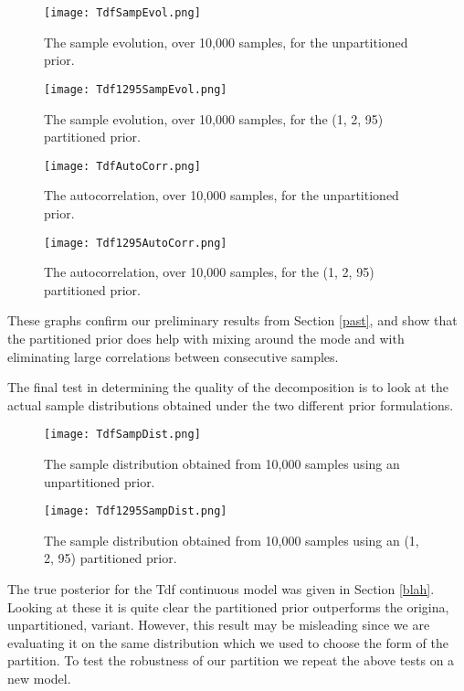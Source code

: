 \begin{figure}[H]
    \centering
    \texttt{[image: TdfSampEvol.png]}
    \caption{The sample evolution, over 10,000 samples, for the unpartitioned prior.}
    \label{fig:UnpSampEvol}
\end{figure}

\begin{figure}[H]
    \centering
    \texttt{[image: Tdf1295SampEvol.png]}
    \caption{The sample evolution, over 10,000 samples, for the (1, 2, 95) partitioned prior.}
    \label{fig:1295SampEvol}
\end{figure}

\begin{figure}[H]
    \centering
    \texttt{[image: TdfAutoCorr.png]}
    \caption{The autocorrelation, over 10,000 samples, for the unpartitioned prior.}
    \label{fig:UnpAutoCorr}
\end{figure}

\begin{figure}[H]
    \centering
    \texttt{[image: Tdf1295AutoCorr.png]}
    \caption{The autocorrelation, over 10,000 samples, for the (1, 2, 95) partitioned prior.}
    \label{fig:1295AutoCorr}
\end{figure}

These graphs confirm our preliminary results from Section \ref{past}, and show that the partitioned prior does help with mixing around the mode and with eliminating large correlations between consecutive samples.

The final test in determining the quality of the decomposition is to look at the actual sample distributions obtained under the two different prior formulations.

\begin{figure}[H]
    \centering
    \texttt{[image: TdfSampDist.png]}
    \caption{The sample distribution obtained from 10,000 samples using an unpartitioned prior.}
    \label{fig:UnpSampDist}
\end{figure}

\begin{figure}[H]
    \centering
    \texttt{[image: Tdf1295SampDist.png]}
    \caption{The sample distribution obtained from 10,000 samples using an (1, 2, 95) partitioned prior.}
    \label{fig:1295SampDist}
\end{figure}

The true posterior for the Tdf continuous model was given in Section \ref{blah}. Looking at these it is quite clear the partitioned prior outperforms the origina, unpartitioned, variant. However, this result may be misleading since we are evaluating it on the same distribution which we used to choose the form of the partition. To test the robustness of our partition we repeat the above tests on a new model.

